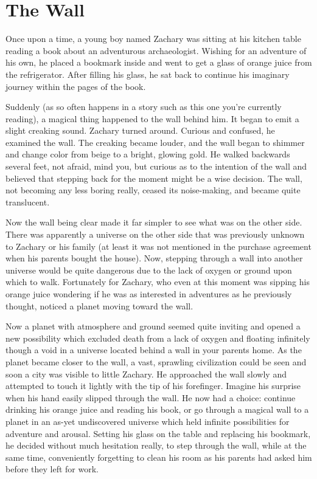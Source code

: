 \chapter{The Wall}

Once upon a time, a young boy named Zachary was sitting at his kitchen table reading a book about an adventurous archaeologist. Wishing for an adventure of his own, he placed a bookmark inside and went to get a glass of orange juice from the refrigerator. After filling his glass, he sat back to continue his imaginary journey within the pages of the book.

Suddenly (as so often happens in a story such as this one you're currently reading), a magical thing happened to the wall behind him. It began to emit a slight creaking sound. Zachary turned around. Curious and confused, he examined the wall. The creaking became louder, and the wall began to shimmer and change color from beige to a bright, glowing gold. He walked backwards several feet, not afraid, mind you, but curious as to the intention of the wall and believed that stepping back for the moment might be a wise decision. The wall, not becoming any less boring really, ceased its noise-making, and became quite translucent.

Now the wall being clear made it far simpler to see what was on the other side. There was apparently a universe on the other side that was previously unknown to Zachary or his family (at least it was not mentioned in the purchase agreement when his parents bought the house). Now, stepping through a wall into another universe would be quite dangerous due to the lack of oxygen or ground upon which to walk. Fortunately for Zachary, who even at this moment was sipping his orange juice wondering if he was as interested in adventures as he previously thought, noticed a planet moving toward the wall.

Now a planet with atmosphere and ground seemed quite inviting and opened a new possibility which excluded death from a lack of oxygen and floating infinitely though a void in a universe located behind a wall in your parents home. As the planet became closer to the wall, a vast, sprawling civilization could be seen and soon a city was visible to little Zachary. He approached the wall slowly and attempted to touch it lightly with the tip of his forefinger. Imagine his surprise when his hand easily slipped through the wall. He now had a choice: continue drinking his orange juice and reading his book, or go through a magical wall to a planet in an as-yet undiscovered universe which held infinite possibilities for adventure and arousal. Setting his glass on the table and replacing his bookmark, he decided without much hesitation really, to step through the wall, while at the same time, conveniently forgetting to clean his room as his parents had asked him before they left for work.

